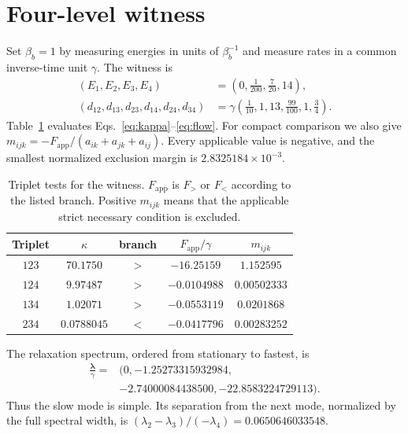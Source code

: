 \documentclass[aps,pre,reprint,superscriptaddress,nofootinbib]{revtex4-2}
\begin{document}
\section{Four-level witness}

Set $\beta_b=1$ by measuring energies in units of $\beta_b^{-1}$ and measure rates
in a common inverse-time unit $\gamma$.  The witness is
\begin{align}
 (E_1,E_2,E_3,E_4)&=\left(0,\frac{1}{200},\frac{7}{20},14\right),\label{eq:energies}\\
 (d_{12},d_{13},d_{23},d_{14},d_{24},d_{34})
 &=\gamma\left(\frac{1}{10},1,13,\frac{99}{100},1,\frac{3}{4}\right).
 \label{eq:rates}
\end{align}
Table~\ref{tab:triplets} evaluates Eqs.~\eqref{eq:kappa}--\eqref{eq:flow}.
For compact comparison we also give
$m_{ijk}=-F_{\mathrm{app}}/(a_{ik}+a_{jk}+a_{ij})$.  Every applicable value is
negative, and the smallest normalized exclusion margin is
$2.8325184\times10^{-3}$.

\begin{table}[t]
\caption{Triplet tests for the witness.  $F_{\mathrm{app}}$ is $F_{>}$ or $F_{<}$
according to the listed branch.  Positive $m_{ijk}$ means that the applicable
strict necessary condition is excluded.}
\label{tab:triplets}
\begin{ruledtabular}
\small
\begin{tabular}{ccccc}
Triplet & $\kappa$ & branch & $F_{\mathrm{app}}/\gamma$ & $m_{ijk}$\\
\hline
$123$ & $70.1750$ & $>$ & $-16.25159$ & $1.152595$\\
$124$ & $9.97487$ & $>$ & $-0.0104988$ & $0.00502333$\\
$134$ & $1.02071$ & $>$ & $-0.0553119$ & $0.0201868$\\
$234$ & $0.0788045$ & $<$ & $-0.0417796$ & $0.00283252$\\
\end{tabular}
\end{ruledtabular}
\end{table}

The relaxation spectrum, ordered from stationary to fastest, is
\begin{equation}
 \begin{split}
 \frac{\bm\lambda}{\gamma}={}&
 (0,-1.25273315932984,\\
 &-2.74000084438500,-22.8583224729113).
 \end{split}
 \label{eq:spectrum}
\end{equation}
Thus the slow mode is simple.  Its separation from the next mode, normalized by
the full spectral width, is
$(\lambda_2-\lambda_3)/(-\lambda_4)=0.0650646033548$.
\end{document}
